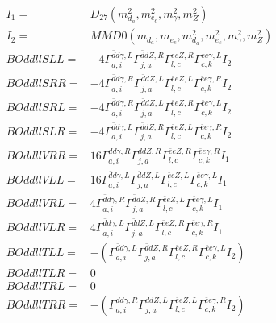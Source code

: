 \documentclass[A4,landscape]{article}
\begin{document}
\begin{align} 
I_1 = & D_{27}(m^2_{d_{{a}}}, m^2_{e_{{c}}}, m^2_{\gamma}, m^2_{Z}) \\ 
I_2 = & MMD0(m_{d_{{a}}}, m_{e_{{c}}}, m^2_{d_{{a}}}, m^2_{e_{{c}}}, m^2_{\gamma}, m^2_{Z}) \\ 
  BOddllSLL= & -4  \Gamma^{\bar{d}d \gamma ,L}_{a, i} \Gamma^{\bar{d}d Z ,R}_{j, a} \Gamma^{\bar{e}e Z ,R}_{l, c} \Gamma^{\bar{e}e \gamma ,L}_{c, k} I_2 \\ 
  BOddllSRR= & -4  \Gamma^{\bar{d}d \gamma ,R}_{a, i} \Gamma^{\bar{d}d Z ,L}_{j, a} \Gamma^{\bar{e}e Z ,L}_{l, c} \Gamma^{\bar{e}e \gamma ,R}_{c, k} I_2 \\ 
  BOddllSRL= & -4  \Gamma^{\bar{d}d \gamma ,R}_{a, i} \Gamma^{\bar{d}d Z ,L}_{j, a} \Gamma^{\bar{e}e Z ,R}_{l, c} \Gamma^{\bar{e}e \gamma ,L}_{c, k} I_2 \\ 
  BOddllSLR= & -4  \Gamma^{\bar{d}d \gamma ,L}_{a, i} \Gamma^{\bar{d}d Z ,R}_{j, a} \Gamma^{\bar{e}e Z ,L}_{l, c} \Gamma^{\bar{e}e \gamma ,R}_{c, k} I_2 \\ 
  BOddllVRR= & 16  \Gamma^{\bar{d}d \gamma ,R}_{a, i} \Gamma^{\bar{d}d Z ,R}_{j, a} \Gamma^{\bar{e}e Z ,R}_{l, c} \Gamma^{\bar{e}e \gamma ,R}_{c, k} I_1 \\ 
  BOddllVLL= & 16  \Gamma^{\bar{d}d \gamma ,L}_{a, i} \Gamma^{\bar{d}d Z ,L}_{j, a} \Gamma^{\bar{e}e Z ,L}_{l, c} \Gamma^{\bar{e}e \gamma ,L}_{c, k} I_1 \\ 
  BOddllVRL= & 4  \Gamma^{\bar{d}d \gamma ,R}_{a, i} \Gamma^{\bar{d}d Z ,R}_{j, a} \Gamma^{\bar{e}e Z ,L}_{l, c} \Gamma^{\bar{e}e \gamma ,L}_{c, k} I_1 \\ 
  BOddllVLR= & 4  \Gamma^{\bar{d}d \gamma ,L}_{a, i} \Gamma^{\bar{d}d Z ,L}_{j, a} \Gamma^{\bar{e}e Z ,R}_{l, c} \Gamma^{\bar{e}e \gamma ,R}_{c, k} I_1 \\ 
  BOddllTLL= & -( \Gamma^{\bar{d}d \gamma ,L}_{a, i} \Gamma^{\bar{d}d Z ,R}_{j, a} \Gamma^{\bar{e}e Z ,R}_{l, c} \Gamma^{\bar{e}e \gamma ,L}_{c, k} I_2) \\ 
  BOddllTLR= & 0 \\ 
  BOddllTRL= & 0 \\ 
  BOddllTRR= & -( \Gamma^{\bar{d}d \gamma ,R}_{a, i} \Gamma^{\bar{d}d Z ,L}_{j, a} \Gamma^{\bar{e}e Z ,L}_{l, c} \Gamma^{\bar{e}e \gamma ,R}_{c, k} I_2) \\ 
\end{align} 
\end{document}
